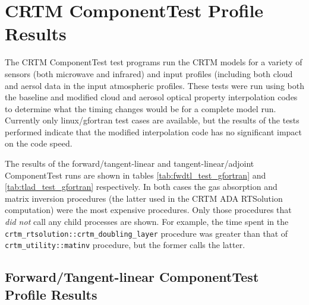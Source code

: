 \section{CRTM ComponentTest Profile Results}

The CRTM ComponentTest test programs run the CRTM models for a variety of sensors (both microwave and infrared) and input profiles (including both cloud and aersol data in the input atmospheric profiles. These tests were run using both the baseline and modified cloud and aerosol optical property interpolation codes to determine what the timing changes would be for a complete model run. Currently only linux/gfortran test cases are available, but the results of the tests performed indicate that the modified interpolation code has no significant impact on the code speed.

The results of the forward/tangent-linear and tangent-linear/adjoint ComponentTest runs are shown in tables \ref{tab:fwdtl_test_gfortran} and \ref{tab:tlad_test_gfortran} respectively. In both cases the gas absorption and matrix inversion procedures (the latter used in the CRTM ADA RTSolution computation) were the most expensive procedures. Only those procedures that \emph{did not} call any child processes are shown. For example, the time spent in the \texttt{crtm\_rtsolution::crtm\_doubling\_layer} procedure was greater than that of \texttt{crtm\_utility::matinv} procedure, but the former calls the latter.

\subsection{Forward/Tangent-linear ComponentTest Profile Results}


